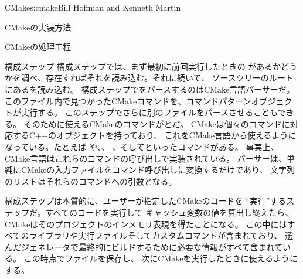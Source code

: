 \begin{aosachapter}{CMake}{s:cmake}{Bill Hoffman and Kenneth Martin}
\begin{aosasect1}{CMakeの実装方法}
\begin{aosasect2}{CMakeの処理工程}
\begin{aosasect3}{構成ステップ}
構成ステップでは、まず最初に前回実行したときの
があるかどうかを調べ、存在すればそれを読み込む。それに続いて、
ソースツリーのルートにあるを読み込む。
構成ステップでをパースするのはCMake言語パーサーだ。
このファイル内で見つかったCMakeコマンドを、コマンドパターンオブジェクトが実行する。
このステップでさらに別のファイルをパースさせることもできる。
そのために使えるCMakeのコマンドがとだ。
CMakeは個々のコマンドに対応するC++のオブジェクトを持っており、
これをCMake言語から使えるようになっている。たとえば
や、、
、そしてといったコマンドがある。
事実上、CMake言語はこれらのコマンドの呼び出しで実装されている。
パーサーは、単純にCMakeの入力ファイルをコマンド呼び出しに変換するだけであり、
文字列のリストはそれらのコマンドへの引数となる。

構成ステップは本質的に、ユーザーが指定したCMakeのコードを
``実行''するステップだ。すべてのコードを実行して
キャッシュ変数の値を算出し終えたら、
CMakeはそのプロジェクトのインメモリ表現を得たことになる。
この中にはすべてのライブラリや実行ファイルそしてカスタムコマンドが含まれており、
選んだジェネレータで最終的にビルドするために必要な情報がすべて含まれている。
この時点でファイルを保存し、
次にCMakeを実行したときに使えるようにする。


\end{aosasect3}
\end{aosasect2}
\end{aosasect1}
\end{aosachapter}

